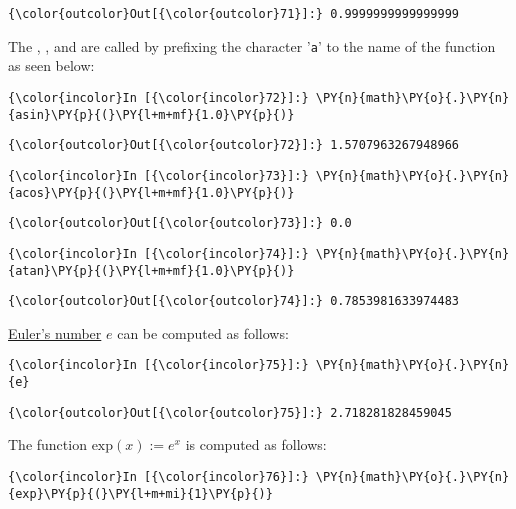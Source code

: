 \begin{Verbatim}[commandchars=\\\{\}]
{\color{outcolor}Out[{\color{outcolor}71}]:} 0.9999999999999999
\end{Verbatim}
The , , and  are called by prefixing the
character '\texttt{a}' to the name of the function as seen below:
\begin{Verbatim}[commandchars=\\\{\}]
{\color{incolor}In [{\color{incolor}72}]:} \PY{n}{math}\PY{o}{.}\PY{n}{asin}\PY{p}{(}\PY{l+m+mf}{1.0}\PY{p}{)}
\end{Verbatim}

\begin{Verbatim}[commandchars=\\\{\}]
{\color{outcolor}Out[{\color{outcolor}72}]:} 1.5707963267948966
\end{Verbatim}
            
\begin{Verbatim}[commandchars=\\\{\}]
{\color{incolor}In [{\color{incolor}73}]:} \PY{n}{math}\PY{o}{.}\PY{n}{acos}\PY{p}{(}\PY{l+m+mf}{1.0}\PY{p}{)}
\end{Verbatim}

\begin{Verbatim}[commandchars=\\\{\}]
{\color{outcolor}Out[{\color{outcolor}73}]:} 0.0
\end{Verbatim}
            
\begin{Verbatim}[commandchars=\\\{\}]
{\color{incolor}In [{\color{incolor}74}]:} \PY{n}{math}\PY{o}{.}\PY{n}{atan}\PY{p}{(}\PY{l+m+mf}{1.0}\PY{p}{)}
\end{Verbatim}

\begin{Verbatim}[commandchars=\\\{\}]
{\color{outcolor}Out[{\color{outcolor}74}]:} 0.7853981633974483
\end{Verbatim} 
\href{https://en.wikipedia.org/wiki/E_(mathematical_constant)}{Euler's number} \(e\) 
can be computed as follows:
\begin{Verbatim}[commandchars=\\\{\}]
{\color{incolor}In [{\color{incolor}75}]:} \PY{n}{math}\PY{o}{.}\PY{n}{e}
\end{Verbatim}

\begin{Verbatim}[commandchars=\\\{\}]
{\color{outcolor}Out[{\color{outcolor}75}]:} 2.718281828459045
\end{Verbatim}
The  function \(\mathrm{exp}(x) := e^x\) is computed as follows:
\begin{Verbatim}[commandchars=\\\{\}]
{\color{incolor}In [{\color{incolor}76}]:} \PY{n}{math}\PY{o}{.}\PY{n}{exp}\PY{p}{(}\PY{l+m+mi}{1}\PY{p}{)}
\end{Verbatim}

